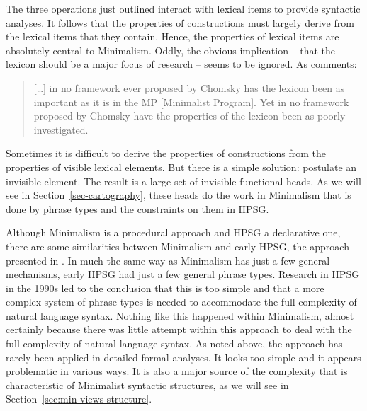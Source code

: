 \documentclass[output=paper
	        ,collection
	        ,collectionchapter
 	        ,biblatex
                ,babelshorthands
                ,newtxmath
                ,draftmode
                ,colorlinks, citecolor=brown
]{langscibook}
\begin{document}
The three operations just outlined interact with lexical items to provide syntactic analyses. It follows that the properties of constructions must largely derive from the lexical items that they contain. Hence, the properties of lexical items are absolutely central to Minimalism. Oddly, the obvious implication – that the lexicon should be a major focus of research – seems to be ignored. As \citet[95, fn.\,9]{Newmeyer2005a} comments:
\begin{quote}
[\ldots] in no framework ever proposed by Chomsky has the lexicon been as important as it is in the
MP [Minimalist Program]. Yet in no framework proposed by Chomsky have the properties of the lexicon
been as poorly investigated. \citep[95, fn.\,9]{Newmeyer2005a}
\end{quote}
Sometimes it is difficult to derive the properties of constructions from the properties of visible
lexical elements. But there is a simple solution: postulate an invisible element. The result is a
large set of invisible functional heads. As we will see in Section~\ref{sec-cartography}, these heads do the work in Minimalism that is done by phrase types and the constraints on them in HPSG.

Although Minimalism is a procedural approach and HPSG a declarative one, there are some
similarities between Minimalism and early HPSG, the approach presented in \citet{ps,ps2}. In much
the same way as Minimalism has just a few general mechanisms, early HPSG had just a few general
phrase types. Research in HPSG in the 1990s led to the conclusion that this is too simple and that a
more complex system of phrase types is needed to accommodate the full complexity of natural language
syntax. Nothing like this happened within Minimalism, almost certainly because there was little
attempt within this approach to deal with the full complexity of natural language syntax. As noted
above, the approach has rarely been applied in detailed formal analyses. It looks too simple and it
appears problematic in various ways. It is also a major source of the complexity that is
characteristic of Minimalist syntactic structures, as we will see in Section~\ref{sec:min-views-structure}. 

\end{document}
